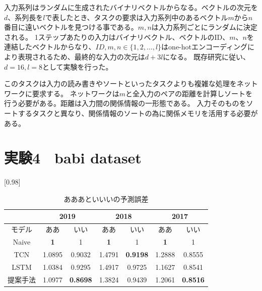 入力系列はランダムに生成されたバイナリベクトルからなる。ベクトルの次元を$d$、系列長を$l$で表したとき、タスクの要求は入力系列中のあるベクトル$m$から$n$番目に遠いベクトルを見つける事である。$m,n$は入力系列ごとにランダムに決定される。
1ステップあたりの入力はバイナリベクトル、ベクトルのID、$m$、$n$を連結したベクトルからなり、$ID,m,n∈\{1,2,…,l\}$はone-hotエンコーディングにより表現されるため、最終的な入力の次元は$d+3l$になる。
既存研究\cite{rrnn}に従い、$d=16,l=8$として実験を行った。

このタスクは入力の読み書きやソートといったタスクよりも複雑な処理をネットワークに要求する。
ネットワークは$m$と全入力のペアの距離を計算しソートを行う必要がある。距離は入力間の関係情報の一形態である。
入力そのものをソートするタスクと異なり、関係情報のソートの為に関係メモリを活用する必要がある。


\section{実験4　babi dataset}

\begin{table}[H]
	\caption{あああといいいの予測誤差}
	\centering
	\scalebox{0.98}[0.98]{
		\begin{tabular}{c|c|c|c|c|c|c}
			\multicolumn{1}{c}{} & \multicolumn{2}{|c|}{2019} 
			& \multicolumn{2}{c|}{2018} & \multicolumn{2}{c}{2017}\\ \hline \hline
			モデル    & ああ & いい & ああ & いい & ああ & いい \\ \hline
			Naive    & \bf{1} & 1 & \bf{1} & 1 & \bf{1} & 1 \\
			TCN      & 1.0895 & 0.9032 & 1.4791 & \bf{0.9198} & 1.2888 & 0.8555 \\
			LSTM     & 1.0384 & 0.9295 & 1.4917 & 0.9725 & 1.1627 & 0.8541 \\
			提案手法  & 1.0977 & \bf{0.8698} & 1.3824 & 0.9439 & 1.2061 & \bf{0.8516} \\
		\end{tabular}
	}
	\label{table:result-1}
\end{table}
